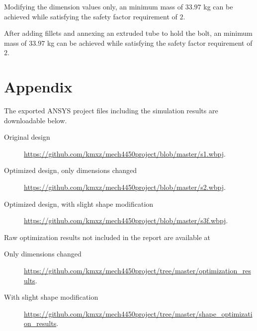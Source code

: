 \documentclass[a4paper,14pt]{extarticle}
\begin{document}
Modifying the dimension values only, an minimum mass of $33.97$ kg can be achieved while satisfying the safety factor requirement of $2$. 

After adding fillets and annexing an extruded tube to hold the bolt, an minimum mass of $33.97$ kg can be achieved while satisfying the safety factor requirement of $2$. 
\section{Appendix}
The exported ANSYS project files including the simulation results are downloadable below. 
\begin{description}
\item[Original design] \url{https://github.com/kmxz/mech4450project/blob/master/s1.wbpj}.
\item[Optimized design, only dimensions changed] \url{https://github.com/kmxz/mech4450project/blob/master/s2.wbpj}.
\item[Optimized design, with slight shape modification] \url{https://github.com/kmxz/mech4450project/blob/master/s3f.wbpj}.
\end{description}

Raw optimization results not included in the report are available at
\begin{description}
\item[Only dimensions changed] \url{https://github.com/kmxz/mech4450project/tree/master/optimization_results}.
\item[With slight shape modification] \url{https://github.com/kmxz/mech4450project/tree/master/shape_optimization_results}.
\end{description}
\end{document}
